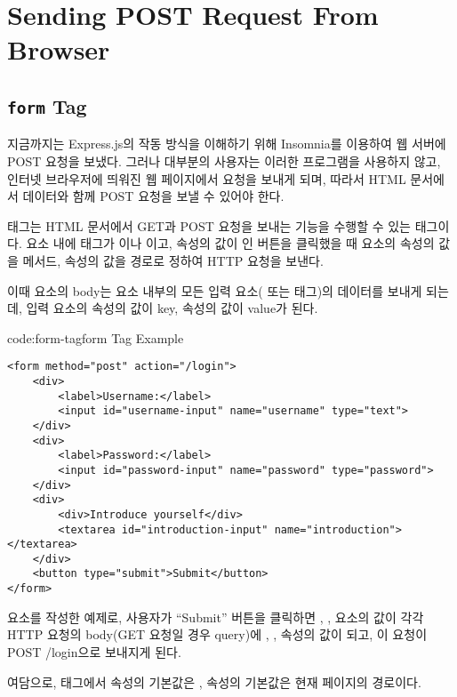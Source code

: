 \section{Sending POST Request From Browser}\label{sect:browser-post-request}

\subsection*{\texttt{form} Tag}

지금까지는 Express.js의 작동 방식을 이해하기 위해 Insomnia를 이용하여 웹 서버에 POST 요청을 보냈다. 그러나 대부분의 사용자는 이러한 프로그램을 사용하지 않고, 인터넷 브라우저에 띄워진 웹 페이지에서 요청을 보내게 되며, 따라서 HTML 문서에서  데이터와 함께 POST 요청을 보낼 수 있어야 한다.

 태그는 HTML 문서에서 GET과 POST 요청을 보내는 기능을 수행할 수 있는 태그이다.  요소 내에 태그가 이나 이고,  속성의 값이 인 버튼을 클릭했을 때  요소의  속성의 값을 메서드,  속성의 값을 경로로 정하여 HTTP 요청을 보낸다.

이때  요소의 body는 요소 내부의 모든 입력 요소( 또는  태그)의 데이터를 보내게 되는데, 입력 요소의  속성의 값이 key,  속성의 값이 value가 된다.

\begin{codeenv}{code:form-tag}{form Tag Example}\begin{verbatim}
<form method="post" action="/login">
    <div>
        <label>Username:</label>
        <input id="username-input" name="username" type="text">
    </div>
    <div>
        <label>Password:</label>
        <input id="password-input" name="password" type="password">
    </div>
    <div>
        <div>Introduce yourself</div>
        <textarea id="introduction-input" name="introduction"></textarea>
    </div>
    <button type="submit">Submit</button>
</form>
\end{verbatim}
\end{codeenv}

\는  요소를 작성한 예제로, 사용자가 ``Submit'' 버튼을 클릭하면 , ,  요소의  값이 각각 HTTP 요청의 body(GET 요청일 경우 query)에 , ,  속성의 값이 되고, 이 요청이 POST /login으로 보내지게 된다.

여담으로,  태그에서  속성의 기본값은 ,  속성의 기본값은 현재 페이지의 경로이다.
